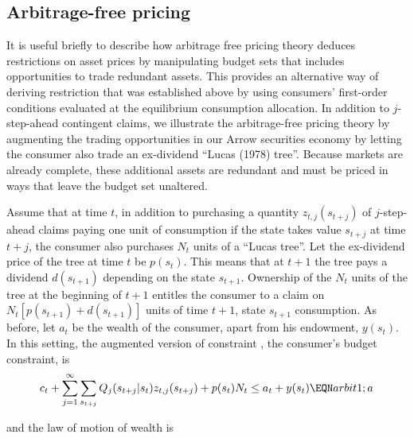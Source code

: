 \subsection{Arbitrage-free pricing}
It is useful briefly to describe how arbitrage free pricing theory
%
 deduces restrictions on asset
prices by manipulating  budget sets that includes opportunities to trade  redundant
assets.
This provides an alternative way of deriving restriction
 that was established above by using consumers'
first-order conditions evaluated at the equilibrium consumption
allocation. In addition to $j$-step-ahead contingent claims, we
illustrate the arbitrage-free pricing theory by augmenting the trading
opportunities in our Arrow securities economy by letting the
consumer also trade  an ex-dividend ``Lucas (1978) tree''.
%
 Because markets
are already complete, these additional assets are redundant and must be priced in ways that leave the budget set
unaltered.


  Assume that at time $t$,  in addition to purchasing
a quantity $z_{t,j}(s_{t+j})$   of $j$-step-ahead claims paying
one unit of consumption  if the state takes value
$s_{t+j}$ at time $t+j$, the consumer also purchases  $N_{t}$
units of  a  ``Lucas tree''. Let the ex-dividend price of the
tree at time $t$  %
 be $p(s_t)$.  This means that at $t+1$  the
tree pays a dividend $d(s_{t+1})$ depending on the
 state $s_{t+1}$. Ownership of the $N_{t}$ units
of the tree  at the beginning of $t+1$ entitles the
consumer to a claim on  $N_{t}[p(s_{t+1}) + d(s_{t+1})]$
 units of time $t+1$, state $s_{t+1}$ consumption.
As before, let $a_t$ be the wealth  of the consumer, apart from
his endowment, $y(s_t)$.  In this setting, the augmented version of
constraint , the consumer's budget constraint, is
$$c_t + \sum_{j=1}^\infty \sum_{s_{t+j}} Q_j(s_{t+j} | s_t)
      z_{t,j}(s_{t+j}) + p(s_t) N_{t} \leq a_t  + y(s_t)
\EQN arbit1;a $$ 

and the law of motion of wealth is

